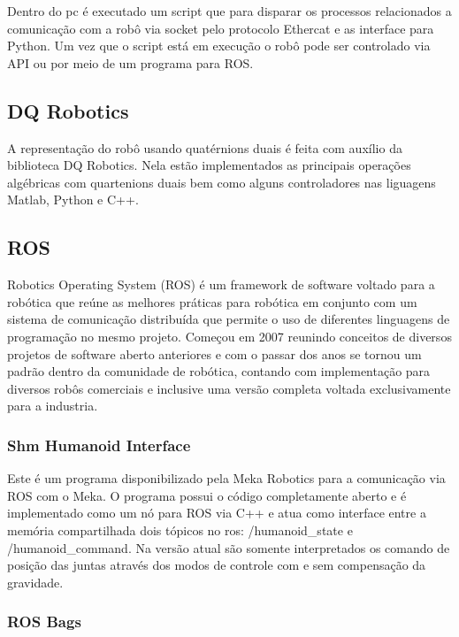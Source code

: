 Dentro do pc é executado um script que para disparar os processos relacionados a comunicação com a robô via socket pelo protocolo Ethercat e as interface para Python. Um vez que o script está em execução o robô pode ser controlado via API ou por meio de um programa para ROS.


\subsection{DQ Robotics}

A representação do robô usando quatérnions duais é feita com auxílio da biblioteca DQ Robotics. Nela estão implementados as principais operações algébricas com quartenions duais bem como alguns controladores nas liguagens Matlab, Python e C++.

\subsection{ROS}

Robotics Operating System (ROS) é um framework de software voltado para a robótica que reúne as melhores práticas para robótica em conjunto com um sistema de comunicação distribuída que permite o uso de diferentes linguagens de programação no mesmo projeto. Começou em 2007 reunindo conceitos de diversos projetos de software aberto anteriores e com o passar dos anos se tornou um padrão dentro da comunidade de robótica, contando com implementação para diversos robôs comerciais e inclusive uma versão completa voltada exclusivamente para a industria.

\subsubsection{Shm Humanoid Interface}

Este é um programa disponibilizado pela Meka Robotics para a comunicação via ROS com o Meka. O programa possui o código completamente aberto e é implementado como um nó para ROS via C++ e atua como interface entre a memória compartilhada dois tópicos no ros: /humanoid\_state e /humanoid\_command. Na versão atual são somente interpretados os comando de posição das juntas através dos modos de controle com e sem compensação da gravidade.

\subsubsection{ROS Bags}

